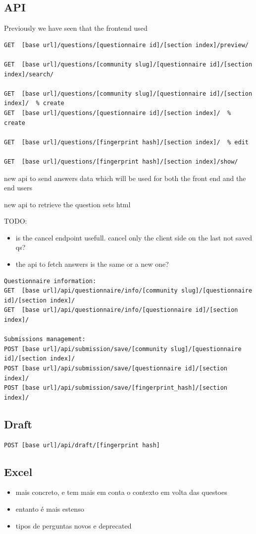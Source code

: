 \subsection{API}

Previously we have seen that the frontend used 

\begin{lstlisting}[basicstyle=\tiny]
GET  [base url]/questions/[questionnaire id]/[section index]/preview/

GET  [base url]/questions/[community slug]/[questionnaire id]/[section index]/search/

GET  [base url]/questions/[community slug]/[questionnaire id]/[section index]/  % create
GET  [base url]/questions/[questionnaire id]/[section index]/  % create

GET  [base url]/questions/[fingerprint hash]/[section index]/  % edit

GET  [base url]/questions/[fingerprint hash]/[section index]/show/
\end{lstlisting}

new api to send answers data which will be used for both the front end and the end users

new api to retrieve the question sets html

TODO:
\begin{itemize}
    \item is the cancel endpoint usefull. cancel only the client side on the last not saved qs?
    \item the api to fetch answers is the same or a new one?
\end{itemize}

\begin{lstlisting}[basicstyle=\scriptsize]
Questionnaire information:
GET  [base url]/api/questionnaire/info/[community slug]/[questionnaire id]/[section index]/
GET  [base url]/api/questionnaire/info/[questionnaire id]/[section index]/

Submissions management:
POST [base url]/api/submission/save/[community slug]/[questionnaire id]/[section index]/
POST [base url]/api/submission/save/[questionnaire id]/[section index]/
POST [base url]/api/submission/save/[fingerprint_hash]/[section index]/
\end{lstlisting}

\subsection*{Draft}

\begin{verbatim}
POST [base url]/api/draft/[fingerprint hash]
\end{verbatim}

\subsection{Excel}
\begin{itemize}
    \item mais concreto, e tem mais em conta o contexto em volta das questoes
    \item entanto é mais estenso
    \item tipos de perguntas novos e deprecated
\end{itemize}
